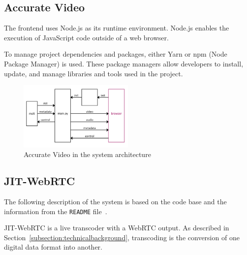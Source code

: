 \documentclass[../MasterThesis.tex]{subfiles}
\begin{document}
\subsection{Accurate Video} \label{subsection:accuratevideo}


The frontend uses Node.js as its runtime environment. Node.js enables the execution of JavaScript code outside of a web browser.~\cite{nodejs, RM_Frontend, ap3_docs}

To manage project dependencies and packages, either Yarn or npm (Node Package Manager) is used. These package managers allow developers to install, update, and manage libraries and tools used in the project.~\cite{RM_Frontend, npmyarn}


\begin{figure}[H]
	\centering
	\includegraphics[width=0.5\textwidth]{IM_FE.png}
	\caption{Accurate Video in the system architecture}
\end{figure}













\subsection{JIT-WebRTC} \label{subsection:jit-webrtc}

The following description of the system is based on the code base and the information from the \texttt{README} file~\cite{RM_Backend}.

JIT-WebRTC is a live transcoder with a WebRTC output. As described in Section~\ref{subsection:technicalbackground}, transcoding is the conversion of one digital data format into another.~\cite{transcoding}
\end{document}
